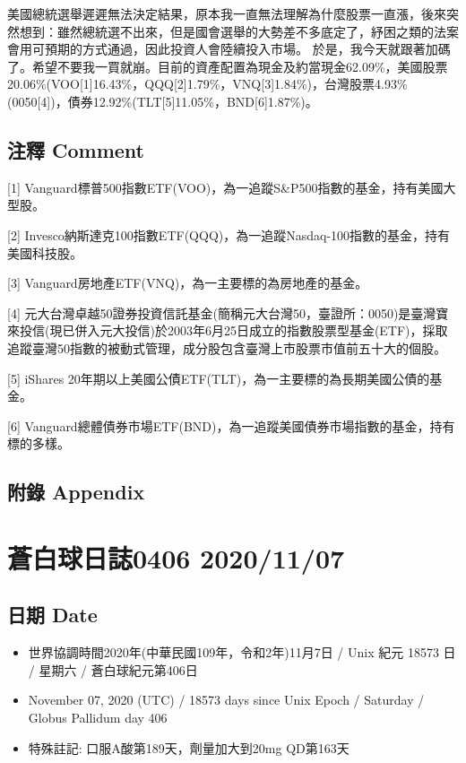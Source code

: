 \documentclass[
]{article}
\providecommand{\tightlist}{%
  \setlength{\itemsep}{0pt}\setlength{\parskip}{0pt}}
\begin{document}
美國總統選舉遲遲無法決定結果，原本我一直無法理解為什麼股票一直漲，後來突然想到：雖然總統選不出來，但是國會選舉的大勢差不多底定了，紓困之類的法案會用可預期的方式通過，因此投資人會陸續投入市場。
於是，我今天就跟著加碼了。希望不要我一買就崩。目前的資產配置為現金及約當現金62.09\%，美國股票20.06\%(VOO{[}1{]}16.43\%，QQQ{[}2{]}1.79\%，VNQ{[}3{]}1.84\%)，台灣股票4.93\%(0050{[}4{]})，債券12.92\%(TLT{[}5{]}11.05\%，BND{[}6{]}1.87\%)。

\hypertarget{ux6ce8ux91cb-comment-62}{%
\subsection{注釋 Comment}\label{ux6ce8ux91cb-comment-62}}

{[}1{]}
Vanguard標普500指數ETF(VOO)，為一追蹤S\&P500指數的基金，持有美國大型股。

{[}2{]}
Invesco納斯達克100指數ETF(QQQ)，為一追蹤Nasdaq-100指數的基金，持有美國科技股。

{[}3{]} Vanguard房地產ETF(VNQ)，為一主要標的為房地產的基金。

{[}4{]}
元大台灣卓越50證券投資信託基金(簡稱元大台灣50，臺證所：0050)是臺灣寶來投信(現已併入元大投信)於2003年6月25日成立的指數股票型基金(ETF)，採取追蹤臺灣50指數的被動式管理，成分股包含臺灣上市股票市值前五十大的個股。

{[}5{]} iShares
20年期以上美國公債ETF(TLT)，為一主要標的為長期美國公債的基金。

{[}6{]}
Vanguard總體債券市場ETF(BND)，為一追蹤美國債券市場指數的基金，持有標的多樣。

\hypertarget{ux9644ux9304-appendix-62}{%
\subsection{附錄 Appendix}\label{ux9644ux9304-appendix-62}}

\hypertarget{ux84bcux767dux7403ux65e5ux8a8c0406-20201107}{%
\section{蒼白球日誌0406
2020/11/07}\label{ux84bcux767dux7403ux65e5ux8a8c0406-20201107}}

\hypertarget{ux65e5ux671f-date-63}{%
\subsection{日期 Date}\label{ux65e5ux671f-date-63}}

\begin{itemize}
\tightlist
\item
  世界協調時間2020年(中華民國109年，令和2年)11月7日 / Unix 紀元 18573 日
  / 星期六 / 蒼白球紀元第406日
\item
  November 07, 2020 (UTC) / 18573 days since Unix Epoch / Saturday /
  Globus Pallidum day 406
\item
  特殊註記: 口服A酸第189天，劑量加大到20mg QD第163天
\end{itemize}
\end{document}
